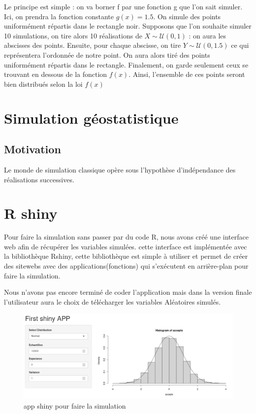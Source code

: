 \documentclass[10pt]{article} %
\begin{document}
Le principe est simple : on va borner f par une fonction g que l'on sait simuler. Ici, on prendra la fonction constante $g(x) = 1.5 $. On simule des points uniformément répartis dans le rectangle noir. Supposons que l'on souhaite simuler 10 simulations, on tire alors 10 réalisations de $X \sim \mathcal{U}(0, 1)$ : on aura les abscisses des points. Ensuite, pour chaque abscisse, on tire $Y \sim \mathcal{U}(0, 1.5)$ ce qui représentera l'ordonnée de notre point. On aura alors tiré des points uniformément répartis dans le rectangle. Finalement, on garde seulement ceux se trouvant en dessous de la fonction $f(x)$. Ainsi, l'ensemble de ces points seront bien distribués selon la loi $f(x)$
\begin{figure}[h!]
\centering

\caption{}
\end{figure}

\section{Simulation géostatistique}

\subsection{Motivation}


Le monde de simulation classique opère sous l'hypothèse d'indépendance des réalisations successives.

\section{R shiny}

Pour faire la simulation sans passer par du code R, nous avons créé une interface web afin de récupérer les variables simulées.
cette interface est implémentée avec la bibliothèque Rshiny, cette bibliothèque est simple à utiliser et permet de créer des sitewebs
avec des applications(fonctions) qui s'exécutent en arrière-plan pour faire la simulation.

Nous n'avons pas encore terminé de coder l'application mais dans la version finale l'utilisateur aura le choix de télécharger les variables
Aléatoires simulés.

\begin{figure}[h!]
\centering
\includegraphics[width=\linewidth]{media/apppic1.png}
\vspace{-5cm}
\caption{app shiny pour faire la simulation}
\end{figure}
\end{document}
